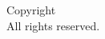 \thispagestyle{empty}
\vspace*{\fill}
\noindent
Copyright \textcopyright{} \the\year{} \thebookauthor \\[2mm]
All rights reserved.
\clearpage
